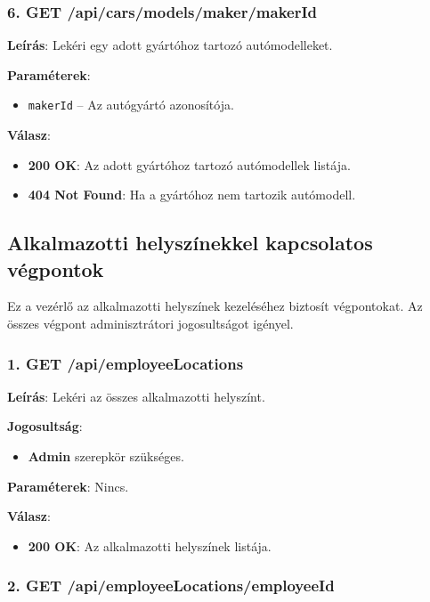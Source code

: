 \documentclass{report}[11pt]
\begin{document}
\subsubsection{6. GET /api/cars/models/maker/{makerId}}

\textbf{Leírás}:  
Lekéri egy adott gyártóhoz tartozó autómodelleket.

\textbf{Paraméterek}:  
\begin{itemize}
    \item \texttt{makerId} – Az autógyártó azonosítója.
\end{itemize}

\textbf{Válasz}:  
\begin{itemize}
    \item \textbf{200 OK}: Az adott gyártóhoz tartozó autómodellek listája.
    \item \textbf{404 Not Found}: Ha a gyártóhoz nem tartozik autómodell.
\end{itemize}

\subsection{Alkalmazotti helyszínekkel kapcsolatos végpontok}

Ez a vezérlő az alkalmazotti helyszínek kezeléséhez biztosít végpontokat. Az összes végpont adminisztrátori jogosultságot igényel.

\subsubsection{1. GET /api/employeeLocations}

\textbf{Leírás}:  
Lekéri az összes alkalmazotti helyszínt.

\textbf{Jogosultság}:  
\begin{itemize}
    \item \textbf{Admin} szerepkör szükséges.
\end{itemize}

\textbf{Paraméterek}:  
Nincs.

\textbf{Válasz}:  
\begin{itemize}
    \item \textbf{200 OK}: Az alkalmazotti helyszínek listája.
\end{itemize}

\subsubsection{2. GET /api/employeeLocations/{employeeId}}
\end{document}
